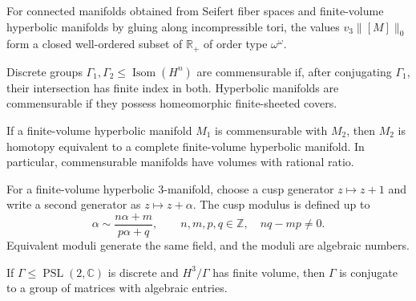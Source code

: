 \begin{corollary}
\label{thurston-ch06-graph-volume-well-order}

For connected manifolds obtained from Seifert fiber spaces and finite-volume hyperbolic manifolds by gluing along incompressible tori, the values $v_3\|[M]\|_0$ form a closed well-ordered subset of $\mathbb R_+$ of order type $\omega^\omega$.
\end{corollary}

\begin{definition}[Commensurability]
\label{thurston-ch06-commensurability}

Discrete groups $\Gamma_1,\Gamma_2\leq\operatorname{Isom}(H^n)$ are commensurable if, after conjugating $\Gamma_1$, their intersection has finite index in both. Hyperbolic manifolds are commensurable if they possess homeomorphic finite-sheeted covers.
\end{definition}

\begin{proposition}
\label{thurston-ch06-commensurable-hyperbolic-model}

If a finite-volume hyperbolic manifold $M_1$ is commensurable with $M_2$, then $M_2$ is homotopy equivalent to a complete finite-volume hyperbolic manifold. In particular, commensurable manifolds have volumes with rational ratio.
\end{proposition}

\begin{definition}
\label{thurston-ch06-cusp-modulus}

For a finite-volume hyperbolic $3$-manifold, choose a cusp generator $z\mapsto z+1$ and write a second generator as $z\mapsto z+\alpha$. The cusp modulus is defined up to
\[
\alpha\sim\frac{n\alpha+m}{p\alpha+q},\qquad n,m,p,q\in\mathbb Z,\quad nq-mp\neq0.
\]
Equivalent moduli generate the same field, and the moduli are algebraic numbers.
\end{definition}

\begin{proposition}
\label{thurston-ch06-algebraic-holonomy}

If $\Gamma\leq\operatorname{PSL}(2,\mathbb C)$ is discrete and $H^3/\Gamma$ has finite volume, then $\Gamma$ is conjugate to a group of matrices with algebraic entries.
\end{proposition}

